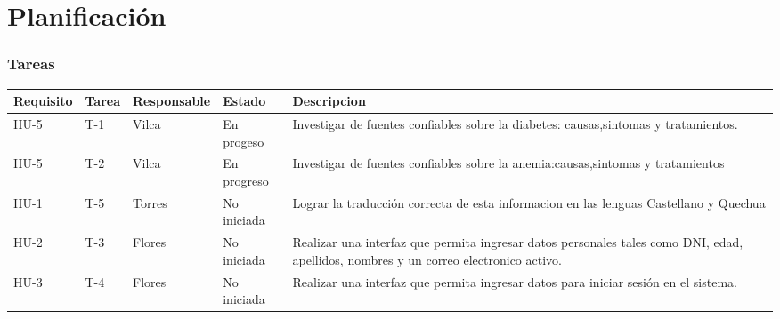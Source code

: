 \chapter{Planificación}

\subsection{Tareas}
\begin{table}[htbp]
	\begin{center}
		\begin{tabular}{| p{1.8cm}| p{1.2cm}| p{2.4cm}|p{2.2cm} |p{7.8cm} |}
	\hline
	\textbf{Requisito} & \textbf{Tarea} & \textbf {Responsable}& \textbf{Estado} & \textbf{Descripcion}
	\\\hline  
	HU-5&T-1&Vilca&En progeso&Investigar de fuentes confiables sobre la diabetes: causas,sintomas y tratamientos.
	 \\ \hline
	HU-5&T-2&Vilca&En progreso&Investigar de fuentes confiables sobre la anemia:causas,sintomas y tratamientos
	 \\ \hline
	HU-1&T-5&Torres&No iniciada&Lograr la traducción correcta de esta informacion en las lenguas Castellano y Quechua
	 \\ \hline
	HU-2&T-3&Flores&No iniciada&Realizar una interfaz que permita ingresar datos personales tales como DNI, edad, apellidos, nombres y un correo electronico activo.
	 \\ \hline
	HU-3&T-4&Flores&No iniciada&Realizar una interfaz que permita ingresar datos para iniciar sesión en el sistema.
	 \\ \hline
		\end{tabular}
\end{center}
\end{table}

